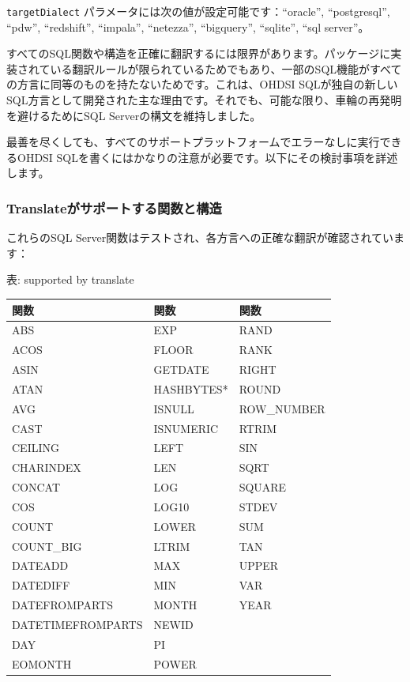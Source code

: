 \documentclass[
  11pt]{book}
\makeatletter
\newenvironment{kframe}{%
\medskip{}
\setlength{\fboxsep}{.8em}
 \def\at@end@of@kframe{}%
 \ifinner\ifhmode%
  \def\at@end@of@kframe{\end{minipage}}%
  \begin{minipage}{\columnwidth}%
 \fi\fi%
 \def\FrameCommand##1{\hskip\@totalleftmargin \hskip-\fboxsep
 \colorbox{myShadeColor}{##1}\hskip-\fboxsep
     \hskip-\linewidth \hskip-\@totalleftmargin \hskip\columnwidth}%
 \MakeFramed {\advance\hsize-\width
   \@totalleftmargin\z@ \linewidth\hsize
   \@setminipage}}%
 {\par\unskip\endMakeFramed%
 \at@end@of@kframe}
\newenvironment{rmdblock}[1]
  {
  \begin{itemize}
  \renewcommand{\labelitemi}{
    \raisebox{-.7\height}[0pt][0pt]{
      {\setkeys{Gin}{width=3em,keepaspectratio}\texttt{[image: images/\#1]}}
    }
  }
  \setlength{\fboxsep}{1em}
  \begin{kframe}
  \item
  }
  {
  \end{kframe}
  \end{itemize}
  }
\newenvironment{rmdimportant}
  {\begin{rmdblock}{important}}
  {\end{rmdblock}}
\theoremstyle{definition}
\theoremstyle{definition}
\theoremstyle{definition}
\theoremstyle{definition}
\theoremstyle{remark}
\makeatother
\begin{document}
\texttt{targetDialect} パラメータには次の値が設定可能です：``oracle'', ``postgresql'', ``pdw'', ``redshift'', ``impala'', ``netezza'', ``bigquery'', ``sqlite'', ``sql server''。 

\begin{rmdimportant}
すべてのSQL関数や構造を正確に翻訳するには限界があります。パッケージに実装されている翻訳ルールが限られているためでもあり、一部のSQL機能がすべての方言に同等のものを持たないためです。これは、OHDSI SQLが独自の新しいSQL方言として開発された主な理由です。それでも、可能な限り、車輪の再発明を避けるためにSQL Serverの構文を維持しました。
\end{rmdimportant}

最善を尽くしても、すべてのサポートプラットフォームでエラーなしに実行できるOHDSI SQLを書くにはかなりの注意が必要です。以下にその検討事項を詳述します。

\subsubsection*{Translateがサポートする関数と構造}\label{translateux304cux30b5ux30ddux30fcux30c8ux3059ux308bux95a2ux6570ux3068ux69cbux9020}

これらのSQL Server関数はテストされ、各方言への正確な翻訳が確認されています：

表: \label{tab:sqlFunctions} supported by translate

\begin{longtable}[]{@{}lll@{}}
\toprule\noalign{}
関数 & 関数 & 関数 \\
\midrule\noalign{}
\endhead
\bottomrule\noalign{}
\endlastfoot
ABS & EXP & RAND \\
ACOS & FLOOR & RANK \\
ASIN & GETDATE & RIGHT \\
ATAN & HASHBYTES* & ROUND \\
AVG & ISNULL & ROW\_NUMBER \\
CAST & ISNUMERIC & RTRIM \\
CEILING & LEFT & SIN \\
CHARINDEX & LEN & SQRT \\
CONCAT & LOG & SQUARE \\
COS & LOG10 & STDEV \\
COUNT & LOWER & SUM \\
COUNT\_BIG & LTRIM & TAN \\
DATEADD & MAX & UPPER \\
DATEDIFF & MIN & VAR \\
DATEFROMPARTS & MONTH & YEAR \\
DATETIMEFROMPARTS & NEWID & \\
DAY & PI & \\
EOMONTH & POWER & \\
\end{longtable}
\end{document}

